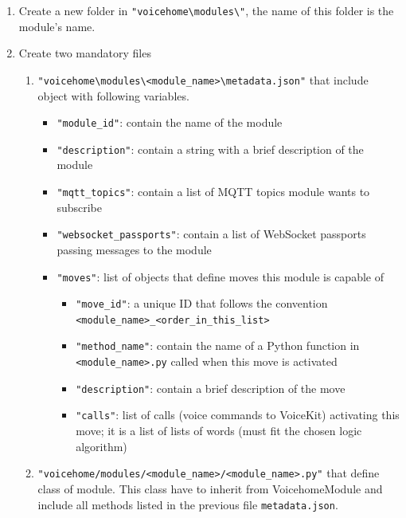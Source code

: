\begin{enumerate}[label=\arabic*)]
    \item Create a new folder in \texttt{"voicehome\textbackslash modules\textbackslash "}, the name of this folder is the module's name.
    \item Create two mandatory files
    \begin{enumerate}
        \item \texttt{"voicehome\textbackslash modules\textbackslash <module\_name>\textbackslash metadata.json"} that include object with following variables.
        \begin{itemize}
            \item \texttt{"module\_id"}: contain the name of the module
            \item \texttt{"description"}: contain a string with a brief description of the module
            \item \texttt{"mqtt\_topics"}: contain a list of MQTT topics module wants to subscribe
            \item \texttt{"websocket\_passports"}: contain a list of WebSocket passports passing messages to the module
            \item \texttt{"moves"}: list of objects that define moves this module is capable of
            \begin{itemize}
                \item \texttt{"move\_id"}: a unique ID that follows the convention \texttt{<module\_name>\_<order\_in\_this\_list>}
                \item \texttt{"method\_name"}: contain the name of a Python function in \texttt{<module\_name>.py} called when this move is activated
                \item \texttt{"description"}: contain a brief description of the move
                \item \texttt{"calls"}: list of calls (voice commands to VoiceKit) activating this move; it is a list of lists of words (must fit the chosen logic algorithm)
            \end{itemize}
        \end{itemize}
        \item \texttt{"voicehome/modules/<module\_name>/<module\_name>.py"} that define class of module. This class have to inherit from VoicehomeModule and include all methods listed in the previous file \texttt{metadata.json}.
        
        
    \end{enumerate}
\end{enumerate}

